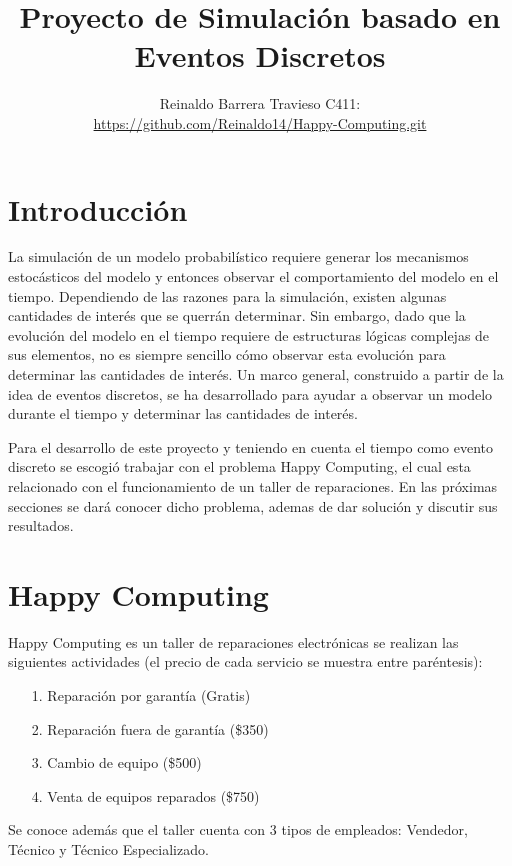 \documentclass[12pt]{article}
\date{}
\author{Reinaldo Barrera Travieso C411: \\ \url{https://github.com/Reinaldo14/Happy-Computing.git}}
\title{Proyecto de Simulación basado en Eventos Discretos}
\begin{document}
\maketitle

\newpage

\section*{Introducción}

La simulación de un modelo probabilístico requiere generar los mecanismos estocásticos del modelo y entonces observar el comportamiento del modelo en el tiempo. Dependiendo de las razones para la simulación, existen algunas cantidades de interés que se querrán determinar. Sin embargo, dado que la evolución del modelo en el tiempo requiere de estructuras lógicas complejas de sus elementos, no es siempre sencillo cómo observar esta evolución para determinar las cantidades de interés. Un marco general, construido a partir de la idea de eventos discretos, se ha desarrollado para ayudar a observar un modelo durante el tiempo y determinar las cantidades de interés.

Para el desarrollo de este proyecto y teniendo en cuenta el tiempo como evento discreto se escogió trabajar con el problema Happy Computing, el cual esta relacionado con el funcionamiento de un taller de reparaciones. En las próximas secciones se dará conocer dicho problema, ademas de dar solución y discutir sus resultados.

\section*{Happy Computing}

Happy Computing es un taller de reparaciones electrónicas se realizan las
siguientes actividades (el precio de cada servicio se muestra entre paréntesis):

\begin{itemize}
        \item[1.] Reparación por garantía (Gratis)
        \item[2.] Reparación fuera de garantía (\$350)
        \item[3.] Cambio de equipo (\$500)
        \item[4.] Venta de equipos reparados (\$750)
\end{itemize}

Se conoce además que el taller cuenta con 3 tipos de empleados: Vendedor,
Técnico y Técnico Especializado.
\end{document}
